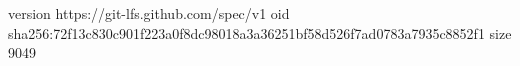 version https://git-lfs.github.com/spec/v1
oid sha256:72f13c830c901f223a0f8dc98018a3a36251bf58d526f7ad0783a7935c8852f1
size 9049
